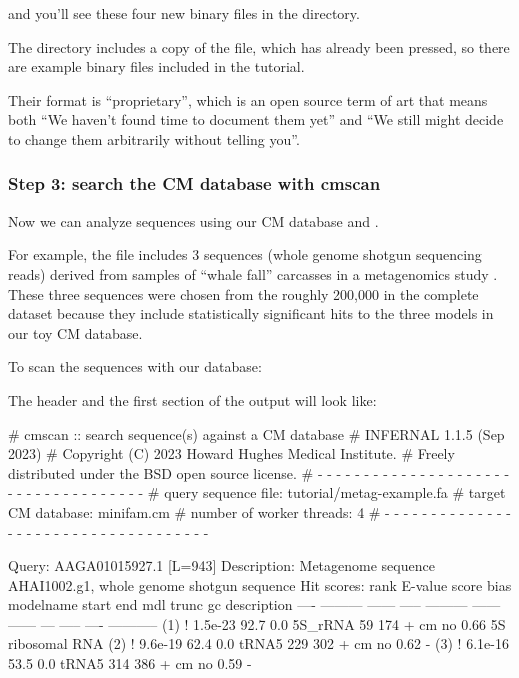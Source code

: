 and you'll see these four new binary files in the directory. 

The  directory includes a copy of the
 file, which has already been pressed, so there
are example binary files 
included in the tutorial.

Their format is ``proprietary'', which is an open source term of art
that means both ``We haven't found time to document them yet'' and ``We
still might decide to change them arbitrarily without telling you''.

\subsubsection{Step 3: search the CM database with cmscan}

Now we can analyze sequences using our CM database and
. 

For example, the file  includes 3
sequences (whole genome shotgun sequencing reads) derived from samples
of ``whale fall'' carcasses in a metagenomics study
\citep{Tringe05}. These three sequences were chosen from the roughly
200,000 in the complete dataset because they include statistically
significant hits to the three models in our toy CM database.

To scan the sequences with our database: 


The header and the first section of the output will look like:

\begin{sreoutput}
# cmscan :: search sequence(s) against a CM database
# INFERNAL 1.1.5 (Sep 2023)
# Copyright (C) 2023 Howard Hughes Medical Institute.
# Freely distributed under the BSD open source license.
# - - - - - - - - - - - - - - - - - - - - - - - - - - - - - - - - - - - -
# query sequence file:                   tutorial/metag-example.fa
# target CM database:                    minifam.cm
# number of worker threads:              4
# - - - - - - - - - - - - - - - - - - - - - - - - - - - - - - - - - - - -

Query:       AAGA01015927.1  [L=943]
Description: Metagenome sequence AHAI1002.g1, whole genome shotgun sequence
Hit scores:
 rank     E-value  score  bias  modelname  start    end   mdl trunc   gc  description
 ----   --------- ------ -----  --------- ------ ------   --- ----- ----  -----------
  (1) !   1.5e-23   92.7   0.0  5S_rRNA       59    174 +  cm    no 0.66  5S ribosomal RNA
  (2) !   9.6e-19   62.4   0.0  tRNA5        229    302 +  cm    no 0.62  -
  (3) !   6.1e-16   53.5   0.0  tRNA5        314    386 +  cm    no 0.59  -
\end{sreoutput}

